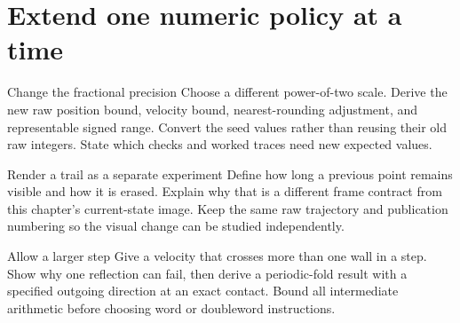 \section{Extend one numeric policy at a time}\label{ball-x-practice}
\begin{MARSExercise}{Change the fractional precision}
  Choose a different power-of-two scale. Derive the new raw position bound,
  velocity bound, nearest-rounding adjustment, and representable signed range.
  Convert the seed values rather than reusing their old raw integers. State which
  checks and worked traces need new expected values.
\end{MARSExercise}
\begin{MARSExercise}{Render a trail as a separate experiment}
  Define how long a previous point remains visible and how it is erased. Explain
  why that is a different frame contract from this chapter's current-state image.
  Keep the same raw trajectory and publication numbering so the visual change can
  be studied independently.
\end{MARSExercise}
\begin{MARSExercise}{Allow a larger step}
  Give a velocity that crosses more than one wall in a step. Show why one reflection
  can fail, then derive a periodic-fold result with a specified outgoing direction
  at an exact contact. Bound all intermediate arithmetic before choosing word or
  doubleword instructions.
\end{MARSExercise}
